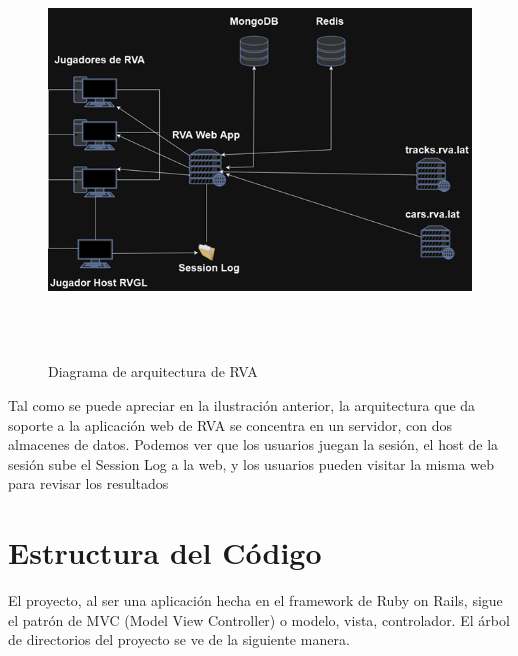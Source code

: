 \begin{figure}[H]
  \begin{center}
    \includegraphics[width=16cm, height=11cm]{img/architecture.png} 
  \end{center}
  \caption[Diagrama de arquitectura de RVA]{Diagrama de arquitectura de RVA}
  \label{fig:architecture.png}
\end{figure}

Tal como se puede apreciar en la ilustración anterior, la arquitectura que da soporte a la aplicación web de RVA se concentra en un servidor, con dos almacenes de datos. Podemos ver que los usuarios juegan la sesión, el host de la sesión sube el Session Log a la web, y los usuarios pueden visitar la misma web para revisar los resultados

\newpage

\section{Estructura del Código}
El proyecto, al ser una aplicación hecha en el framework de Ruby on Rails, sigue el patrón de MVC (Model View Controller) o modelo, vista, controlador. El árbol de directorios del proyecto se ve de la siguiente manera.

